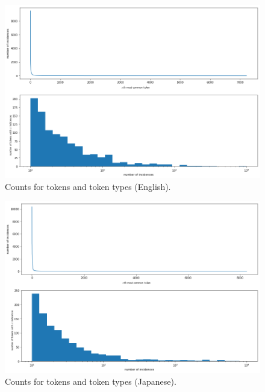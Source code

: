 \documentclass[answers]{exam}
\begin{document}
\begin{CJK}{UTF8}{min}
\begin{figure}
  \centering
  \includegraphics[width=\linewidth]{fig-toks-en}
  \caption{Counts for tokens and token types (English).}
  \label{fig:toks-en}
\end{figure}

\begin{figure}
  \centering
  \includegraphics[width=\linewidth]{fig-toks-fr}
  \caption{Counts for tokens and token types (Japanese).}
  \label{fig:toks-fr}
\end{figure}

\end{CJK}
\end{document}
